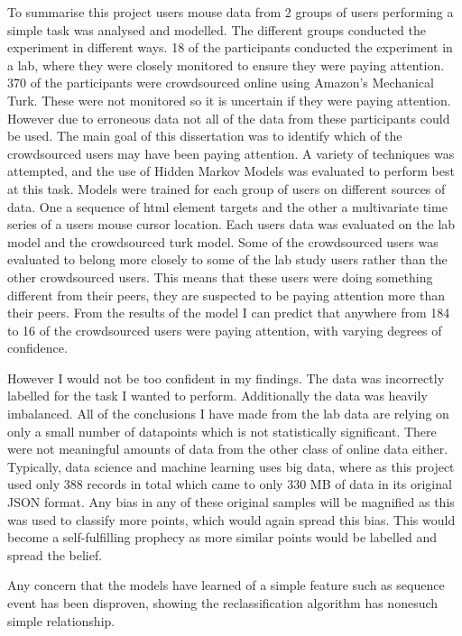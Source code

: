 \documentclass{article}
\begin{document}
To summarise this project users mouse data from 2 groups of users performing a simple task was analysed and modelled.
The different groups conducted the experiment in different ways.
18 of the participants conducted the experiment in a lab, where they were closely monitored to ensure they were paying attention.
370 of the participants were crowdsourced online using Amazon’s Mechanical Turk.
These were not monitored so it is uncertain if they were paying attention.
However due to erroneous data not all of the data from these participants could be used.
The main goal of this dissertation was to identify which of the crowdsourced users may have been paying attention.
A variety of techniques was attempted, and the use of Hidden Markov Models was evaluated to perform best at this task.
Models were trained for each group of users on different sources of data. 
One a sequence of html element targets and the other a multivariate time series of a users mouse cursor location.
Each users data was evaluated on the lab model and the crowdsourced turk model.
Some of the crowdsourced users was evaluated to belong more closely to some of the lab study users rather than the other crowdsourced users.
This means that these users were doing something different from their peers, they are suspected to be paying attention more than their peers. 
From the results of the model I can predict that anywhere from 184 to 16 of the crowdsourced users were paying attention, with varying degrees of confidence.

However I would not be too confident in my findings.
The data was incorrectly labelled for the task I wanted to perform.
Additionally the data was heavily imbalanced.
All of the conclusions I have made from the lab data are relying on only a small number of datapoints which is not statistically significant.
There were not meaningful amounts of data from the other class of online data either.
Typically, data science and machine learning uses big data, where as this project used only 388 records in total which came to only 330 MB of data in its original JSON format.
Any bias in any of these original samples will be magnified as this was used to classify more points, which would again spread this bias.
This would become a self-fulfilling prophecy as more similar points would be labelled and spread the belief.

Any concern that the models have learned of a simple feature such as sequence event has been disproven, showing the reclassification algorithm has nonesuch simple relationship.
\end{document}
